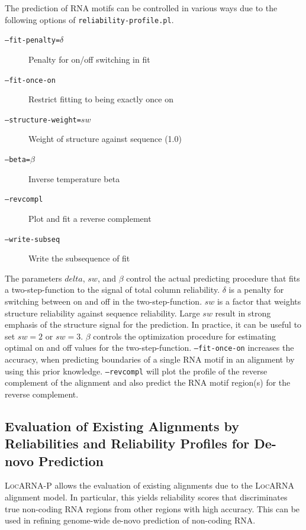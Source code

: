 \documentclass{article}
\newcommand{\LocARNA}{\textsc{LocARNA}}
\newcommand{\LocARNAP}{\textsc{LocARNA-P}}
\begin{document}
The prediction of RNA motifs can be controlled in various ways due to
the following options of \texttt{reliability-profile.pl}.

\begin{description}
       \item[\texttt{--fit-penalty=$\delta$}]  Penalty for on/off switching in fit
       \item[\texttt{--fit-once-on}]           Restrict fitting to being exactly once on
       \item[\texttt{--structure-weight=$sw$}] Weight of structure
         against sequence (1.0)
       \item[\texttt{--beta=$\beta$}]          Inverse temperature beta
       \item[\texttt{--revcompl}]              Plot and fit a reverse complement
       \item[\texttt{--write-subseq}]          Write the subsequence of fit
\end{description}

The parameters $delta$, $sw$, and $\beta$ control the actual
predicting procedure that fits a two-step-function to the signal of
total column reliability. $\delta$ is a penalty for switching between
on and off in the two-step-function. $sw$ is a factor that weights
structure reliability against sequence reliability. Large $sw$ result
in strong emphasis of the structure signal for the prediction. In
practice, it can be useful to set $sw=2$ or $sw=3$. $\beta$ controls
the optimization procedure for estimating optimal on and off values
for the two-step-function. \texttt{--fit-once-on} increases the
accuracy, when predicting boundaries of a single RNA motif in an
alignment by using this prior knowledge. \texttt{--revcompl} will plot
the profile of the reverse complement of the alignment and also
predict the RNA motif region(s) for the reverse complement.


\subsection{Evaluation of Existing Alignments by Reliabilities and
  Reliability Profiles for De-novo Prediction}

\LocARNAP{} allows the evaluation of existing alignments due to the
\LocARNA{} alignment model. In particular, this yields reliability
scores that discriminates true non-coding RNA regions from other
regions with high accuracy. This can be used in refining genome-wide
de-novo prediction of non-coding RNA.
\end{document}
